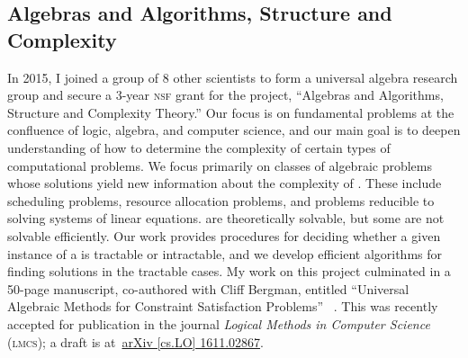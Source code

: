 \subsection{Algebras and Algorithms, Structure and Complexity}
\label{sec:csp}
In 2015, I joined a group of 8 other scientists to form a universal algebra research group and secure a 3-year \textsc{nsf} grant for the project, ``Algebras and Algorithms, Structure and Complexity Theory.'' Our focus is on fundamental problems at the confluence of logic, algebra, and computer science, and our main goal is to deepen understanding of how to determine the complexity of certain types of computational problems.  We focus primarily on classes of algebraic problems whose solutions yield new information about the complexity of \csps. These include scheduling problems, resource allocation problems, and problems reducible to solving systems of linear equations. \csps are theoretically solvable, but some are not solvable efficiently.  Our work provides procedures for deciding whether a given instance of a \csp is tractable or intractable, and we develop efficient algorithms for finding solutions in the tractable cases. My work on this project culminated in a 50-page manuscript, co-authored with Cliff Bergman, entitled ``Universal Algebraic Methods for Constraint Satisfaction Problems'' ~\cite{Bergman-DeMeo:2016}. This was recently accepted for publication in the journal \textit{Logical Methods in Computer Science} \textsc{(lmcs)}; a draft is at~\href{https://arxiv.org/abs/1611.02867}{arXiv [cs.LO] 1611.02867}.





% 



 \newpage

     
     


















